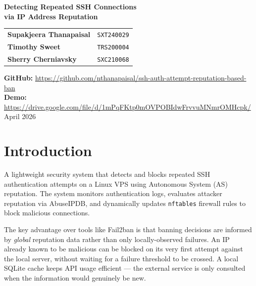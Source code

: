\documentclass[11pt, letterpaper]{article}
\begin{document}
\begin{titlepage}
    \centering
    \vspace*{2.5cm}
    {\huge\bfseries Detecting Repeated SSH Connections\\[0.4em]
    via IP Address Reputation\par}
    \vspace{2cm}

    \begin{tabular}{ll}
        \textbf{Supakjeera Thanapaisal} & \texttt{SXT240029} \\[0.4em]
        \textbf{Timothy Sweet}          & \texttt{TRS200004} \\[0.4em]
        \textbf{Sherry Cherniavsky}     & \texttt{SXC210068} \\
    \end{tabular}

    \vspace{1.5cm}
    \textbf{GitHub:} \small\url{https://github.com/nthanapaisal/ssh-auth-attempt-reputation-based-ban}\\[0.6em]
    \textbf{Demo:} \small\url{https://drive.google.com/file/d/1mPqFKtp0mOVPOBIdwFrvvuMNmrOMHcpk/}\\[0.6em]
    
    \vfill
    {\normalsize April 2026}
\end{titlepage}

\tableofcontents
\newpage

\section{Introduction}

A lightweight security system that detects and blocks repeated SSH authentication attempts on a Linux VPS using Autonomous System (AS) reputation. The system monitors authentication logs, evaluates attacker reputation via AbuseIPDB, and dynamically updates \texttt{nftables} firewall rules to block malicious connections.

The key advantage over tools like Fail2ban is that banning decisions are informed by \textit{global} reputation data rather than only locally-observed failures. An IP already known to be malicious can be blocked on its very first attempt against the local server, without waiting for a failure threshold to be crossed. A local SQLite cache keeps API usage efficient --- the external service is only consulted when the information would genuinely be new.
\end{document}
